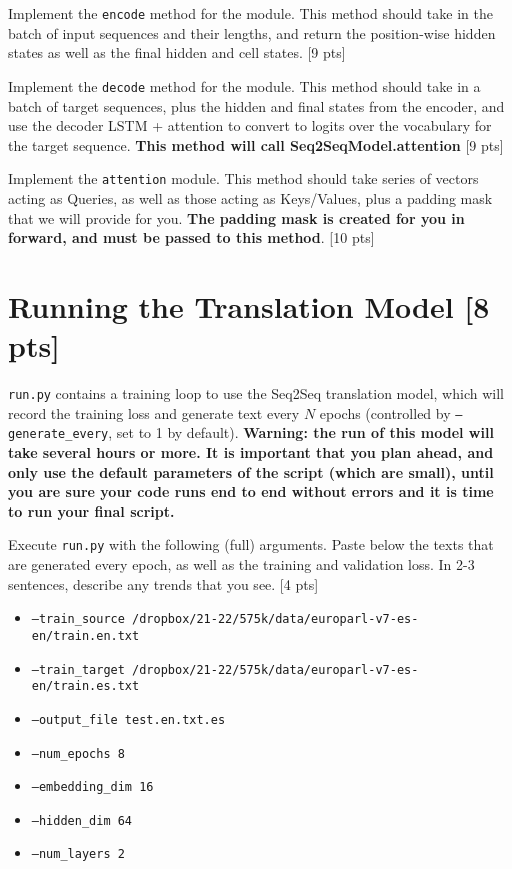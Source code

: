 \documentclass[11pt]{article}
\begin{document}
\vspace{2em}
 Implement the \texttt{encode} method for the module. This method should take in the batch of input sequences and their lengths, and return the position-wise hidden states as well as the final hidden and cell states. \hfill [9 pts]

\vspace{2em}
 Implement the \texttt{decode} method for the module. This method should take in a batch of target sequences, plus the hidden and final states from the encoder, and use the decoder LSTM + attention to convert to logits over the vocabulary for the target sequence. \textbf{This method will call Seq2SeqModel.attention} \hfill [9 pts]

\vspace{2em}
 Implement the \texttt{attention} module. This method should take series of vectors acting as Queries, as well as those acting as Keys/Values, plus a padding mask that we will provide for you. \textbf{The padding mask is created for you in forward, and must be passed to this method}. \hfill [10 pts]

\section{Running the Translation Model [8 pts]}

\texttt{run.py} contains a training loop to use the Seq2Seq translation model, which will record the training loss and generate text every $N$ epochs (controlled by \texttt{--generate\_every}, set to 1 by default). \textbf{Warning: the run of this model will take several hours or more. It is important that you plan ahead, and only use the default parameters of the script (which are small), until you are sure your code runs end to end without errors and it is time to run your final script.}

\vspace{2em}
  Execute \texttt{run.py} with the following (full) arguments. Paste below the texts that are generated every epoch, as well as the training and validation loss.  In 2-3 sentences, describe any trends that you see. \hfill [4 pts]
\begin{itemize}
    \item \texttt{--train\_source /dropbox/21-22/575k/data/europarl-v7-es-en/train.en.txt}
    \item \texttt{--train\_target /dropbox/21-22/575k/data/europarl-v7-es-en/train.es.txt}
    \item \texttt{--output\_file test.en.txt.es}
    \item \texttt{--num\_epochs 8}
    \item \texttt{--embedding\_dim 16}
    \item \texttt{--hidden\_dim 64}
    \item \texttt{--num\_layers 2}
\end{itemize}
\end{document}
